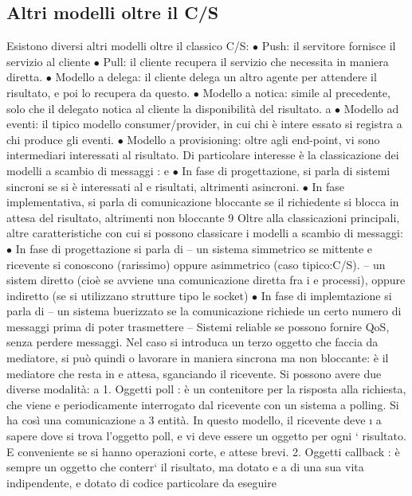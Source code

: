 \documentclass[a4paper,12pt]{article}
\begin{document}
\subsection{Altri modelli oltre il C/S}
Esistono diversi altri modelli oltre il classico C/S:
$\bullet$ Push: il servitore fornisce il servizio al cliente
$\bullet$ Pull: il cliente recupera il servizio che necessita in maniera diretta.
$\bullet$ Modello a delega: il cliente delega un altro agente per attendere il risultato,
e poi lo recupera da questo.
$\bullet$ Modello a notica: simile al precedente, solo che il delegato notica al
cliente la disponibilità del risultato.
a
$\bullet$ Modello ad eventi: il tipico modello consumer/provider, in cui chi è intere
essato si registra a chi produce gli eventi.
$\bullet$ Modello a provisioning: oltre agli end-point, vi sono intermediari interessati al risultato.
Di particolare interesse è la classicazione dei modelli a scambio di messaggi :
e
$\bullet$ In fase di progettazione, si parla di sistemi sincroni se si è interessati al
e
risultati, altrimenti asincroni.
$\bullet$ In fase implementativa, si parla di comunicazione bloccante se il richiedente
si blocca in attesa del risultato, altrimenti non bloccante
9
Oltre alla classicazioni principali, altre caratteristiche con cui si possono classicare i modelli a scambio di
messaggi:
$\bullet$ In fase di progettazione si parla di
-- un sistema simmetrico se mittente e ricevente si conoscono (rarissimo) oppure asimmetrico (caso tipico:C/S).
-- un sistem diretto (cioè se avviene una comunicazione diretta fra i
e
processi), oppure indiretto (se si utilizzano strutture tipo le socket)
$\bullet$ In fase di implemtazione si parla di
-- un sistema buerizzato se la comunicazione richiede un certo numero
di messaggi prima di poter trasmettere
-- Sistemi reliable se possono fornire QoS, senza perdere messaggi.
Nel caso si introduca un terzo oggetto che faccia da mediatore, si può quindi
o
lavorare in maniera sincrona ma non bloccante: è il mediatore che resta in
e
attesa, sganciando il ricevente. Si possono avere due diverse modalità:
a
1. Oggetti poll : è un contenitore per la risposta alla richiesta, che viene
e
periodicamente interrogato dal ricevente con un sistema a polling. Si ha
così una comunicazione a 3 entità. In questo modello, il ricevente deve
\i{}
a
sapere dove si trova l'oggetto poll, e vi deve essere un oggetto per ogni
`
risultato. E conveniente se si hanno operazioni corte, e attese brevi.
2. Oggetti callback : è sempre un oggetto che conterr` il risultato, ma dotato
e
a
di una sua vita indipendente, e dotato di codice particolare da eseguire
\end{document}
